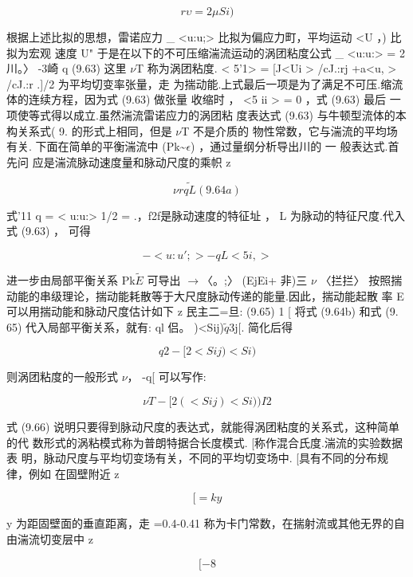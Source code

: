 \[r\upsilon =2\mu S i)\]

根据上述比拟的思想，雷诺应力 \_ <u:u;> 比拟为偏应力町，平均运动 <U ，) 比拟为宏观 速度 U" 于是在以下的不可压缩湍流运动的涡团粘度公式 \_ <u:u:> = 2 川。〉 -3崎 q (9.63) 这里 $\nu$T 称为涡团粘度. < 5'1> = [J<Ui > /cJ.:rj +a<u, > /cJ.:r .]/2 为平均切变率张量，走 为揣动能.上式最后一项是为了满足不可压.缩流体的连续方程，因为式 (9.63) 做张量 收缩时 ， <5 ii > = 0 ，式 (9.63) 最后 一 项使等式得以成立.虽然湍流雷诺应力的涡团粘 度表达式 (9.63) 与牛顿型流体的本构关系式( 9. 的形式上相同，但是 $\nu$T 不是介质的 物性常数，它与湍流的平均场有关. 下面在简单的平衡湍流中 (Pk\textasciitilde{}$\epsilon$) ，通过量纲分析导出川的 一 般表达式.首先问 应是湍流脉动速度量和脉动尺度的乘帜 z

\[\nu r \tilde{qL} (9. 64a)\]

式'11 q = < u:u:> 1/2 = .，f2f是脉动速度的特征址 ， L 为脉动的特征尺度.代入式 (9.63) ， 可得

\begin{equation*}- < u:u '; > - qL < 5i, >\tag{9.64b}\end{equation*}

进一步由局部平衡关系 Pk$\tilde{E}$ 可导出 $\rightarrow$〈。;〉 (EjEi+ 非)三 $\nu$ 〈拦拦〉 按照揣动能的串级理论，揣动能耗散等于大尺度脉动传递的能量.因此，揣动能起散 率 E 可以用揣动能和脉动尺度估计如下 z 民主二=旦: (9.65) 1 [ 将式 (9.64b) 和式 (9. 65) 代入局部平衡关系，就有: ql 侣。 )<Sij)$\tilde{q}$3j[. 简化后得

\[q2 - [2 < Sij ) < S i )\]

则涡团粘度的一般形式 $\nu$， -q[ 可以写作:

\begin{equation*}\nu  T - [2 ( < Sij ) < Si ) ) I 2\tag{9.66}\end{equation*}

式 (9.66) 说明只要得到脉动尺度的表达式，就能得涡团粘度的关系式，这种简单的代 数形式的涡粘模式称为普朗特据合长度模式. [称作混合氏度.湍流的实验数据表 明，脉动尺度与平均切变场有关，不同的平均切变场中. [具有不同的分布规律，例如 在固壁附近 z

\begin{equation*}[ = ky\tag{9.67a}\end{equation*}

y 为距固壁面的垂直距离，走 =0.4-0.41 称为卡门常数，在揣射流或其他无界的自 由湍流切变层中 z

\begin{equation*}[-8\tag{9.67b}\end{equation*}

